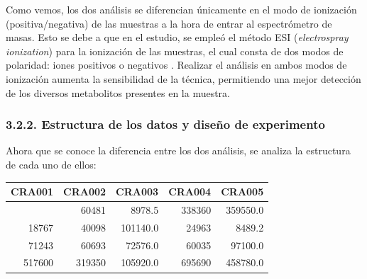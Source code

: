 \documentclass[
]{article}
\newenvironment{Shaded}{\begin{snugshade}}{\end{snugshade}}
\newcommand{\CommentTok}[1]{\textcolor[rgb]{0.56,0.35,0.01}{\textit{#1}}}
\newcommand{\DecValTok}[1]{\textcolor[rgb]{0.00,0.00,0.81}{#1}}
\newcommand{\FunctionTok}[1]{\textcolor[rgb]{0.13,0.29,0.53}{\textbf{#1}}}
\newcommand{\NormalTok}[1]{#1}
\newcommand{\OtherTok}[1]{\textcolor[rgb]{0.56,0.35,0.01}{#1}}
\newcommand{\SpecialCharTok}[1]{\textcolor[rgb]{0.81,0.36,0.00}{\textbf{#1}}}
\begin{document}
Como vemos, los dos análisis se diferencian únicamente en el modo de
ionización (positiva/negativa) de las muestras a la hora de entrar al
espectrómetro de masas. Esto se debe a que en el estudio, se empleó el
método ESI (\emph{electrospray ionization}) para la ionización de las
muestras, el cual consta de dos modos de polaridad: iones positivos o
negativos \citep{Agarwal}. Realizar el análisis en ambos modos de
ionización aumenta la sensibilidad de la técnica, permitiendo una mejor
detección de los diversos metabolitos presentes en la muestra.

\subsubsection{3.2.2. Estructura de los datos y diseño de
experimento}\label{estructura-de-los-datos-y-diseuxf1o-de-experimento}

Ahora que se conoce la diferencia entre los dos análisis, se analiza la
estructura de cada uno de ellos:

\begin{Shaded}
\end{Shaded}

\begin{longtable}[]{@{}rrrrr@{}}
\toprule\noalign{}
CRA001 & CRA002 & CRA003 & CRA004 & CRA005 \\
\midrule\noalign{}
\endhead
\bottomrule\noalign{}
\endlastfoot
28072 & 60481 & 8978.5 & 338360 & 359550.0 \\
18767 & 40098 & 101140.0 & 24963 & 8489.2 \\
71243 & 60693 & 72576.0 & 60035 & 97100.0 \\
517600 & 319350 & 105920.0 & 695690 & 458780.0 \\
\end{longtable}

\begin{Shaded}
\end{Shaded}
\end{document}
